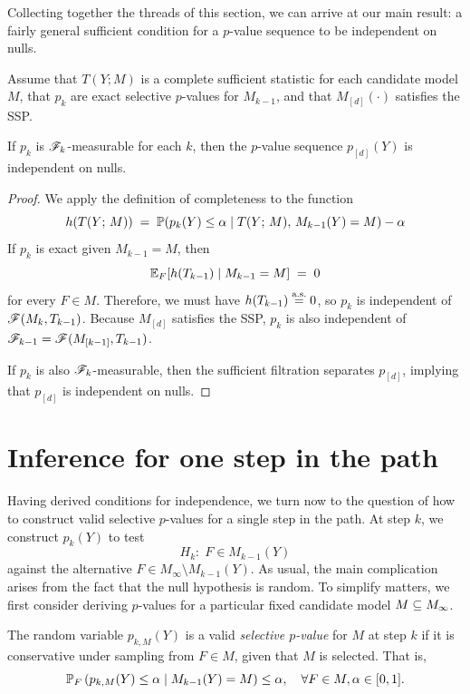 \documentclass{article}
\begin{document}
Collecting together the threads of this section, we can arrive at our main result: a fairly general sufficient condition for a $p$-value sequence to be independent on nulls.
\begin{theorem} \label{thm:suffCond}
Assume that $T(Y; M)$ is a complete sufficient statistic for each candidate model $M$, that $p_k$ are exact selective $p$-values for $M_{k-1}$, and that $M_{[d]}(\cdot)$ satisfies the SSP.

If $p_k$ is $\sF_k$-measurable for each $k$, then the $p$-value sequence $p_{[d]}(Y)$ is independent on nulls.
\end{theorem}

\begin{proof}
We apply the definition of completeness to the function 
\[
h(T(Y; \, M)) \;=\; 
\P(p_k(Y) \leq \alpha \mid T(Y; \, M), \, M_{k-1}(Y) = M) - \alpha
\]
If $p_k$ is exact given $M_{k-1} = M$, then 
\[
\E_F[h(T_{k-1}) \mid M_{k-1}=M] \;=\; 0
\] 
for every $F\in M$. Therefore, we must have $h(T_{k-1})\eqAS 0$, so $p_k$ is independent of $\sF(M_k, T_{k-1})$. Because $M_{[d]}$ satisfies the SSP, $p_k$ is also independent of $\sF_{k-1} = \sF(M_{[k-1]}, T_{k-1})$.

If $p_k$ is also $\sF_k$-measurable, then the sufficient filtration separates $p_{[d]}$, implying that $p_{[d]}$ is independent on nulls.
\end{proof}

\section{Inference for one step in the path}
\label{sec:singleStep}

Having derived conditions for independence, we turn now to the question of how to construct valid selective $p$-values for a single step in the path. At step $k$, we construct $p_k(Y)$ to test
\[
  H_{k}:\; F \in M_{k-1}(Y)
\]
against the alternative $F \in M_\infty \setminus M_{k-1}(Y)$. As usual, the main complication arises from the fact that the null hypothesis is random. To simplify matters, we first consider deriving $p$-values for a particular fixed candidate model $M\sub M_{\infty}$.

The random variable  $p_{k,M}(Y)$ is a valid {\em selective $p$-value} for $M$ at step $k$ if it is conservative under sampling from $F\in M$, given that $M$ is selected. That is,
\[
\P_F\left(p_{k,M}(Y) \leq \alpha \mid M_{k-1}(Y) = M\right) 
\leq \alpha, \quad \forall F\in M, \alpha \in [0,1].
\]
\end{document}
